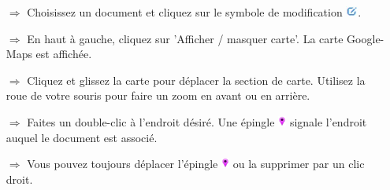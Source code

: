 \documentclass{article}
\begin{document}
\begin{multicols}{2}
\begin{tcolorbox}[colback=blue!5,colframe=blue!40!black,title=Associer des documents à Google-Maps]
\begin{itemize}
  \item[$\Longrightarrow$] Choisissez un document et cliquez sur le symbole de modification \includegraphics[height=10pt]{Icons/bearbeiten.jpg}.
  \item[$\Longrightarrow$] En haut à gauche, cliquez sur 'Afficher / masquer carte'. La carte Google-Maps est affichée.
  \item[$\Longrightarrow$] Cliquez et glissez la carte pour déplacer la section de carte. Utilisez la roue de votre souris pour faire un zoom en avant ou en arrière.
  \item[$\Longrightarrow$] Faites un double-clic à l'endroit désiré. Une épingle \includegraphics[height=10pt]{Icons/vNadel.jpg} signale l'endroit auquel le document est associé.
	\item[$\Longrightarrow$] Vous pouvez toujours déplacer l'épingle \includegraphics[height=10pt]{Icons/vNadel.jpg} ou la supprimer par un clic droit.
\end{itemize}
\end{tcolorbox}


\end{multicols}

\end{document}
